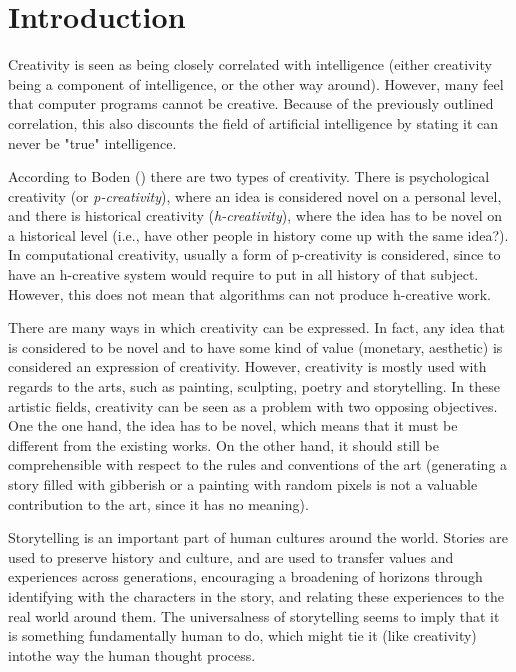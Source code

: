\section{Introduction}

Creativity is seen as being closely correlated with intelligence (either
creativity being a component of intelligence, or the other way around).
However, many feel that computer programs cannot be creative. Because of the
previously outlined correlation, this also discounts the field of artificial
intelligence by stating it can never be "true" intelligence.

According to Boden (\cite{Boden1998347})
there are two types of creativity. There is psychological creativity (or
\emph{p-creativity}), where an idea is considered novel on a personal level, and
there is historical creativity (\emph{h-creativity}), where the idea has to be
novel on a historical level (i.e., have other people in history come up with the
same idea?).
In computational creativity, usually a form of p-creativity is considered, since
to have an h-creative system would require to put in all history of that
subject. However, this does not mean that algorithms can not produce h-creative
work.

There are many ways in which creativity can be expressed. In fact, any idea that
is considered to be novel and to have some kind of value (monetary, aesthetic) is
considered an expression of creativity. However, creativity is mostly used with regards to
the arts, such as painting, sculpting, poetry and storytelling. In these
artistic fields, creativity can be seen as a problem with two opposing
objectives. One the one hand, the idea has to be novel, which means that it must be different from
the existing works. On the other hand, it should still be comprehensible with
respect to the rules and conventions of the art (generating a story filled with
gibberish or a painting with random pixels is not a valuable contribution to the
art, since it has no meaning).

Storytelling is an important part of human cultures around the world.
Stories are used to preserve history and culture, and are used to transfer values
and experiences across generations, encouraging a broadening of horizons through
identifying with the characters in the story, and relating these experiences to
the real world around them. The universalness of storytelling seems to imply
that it is something fundamentally human to do, which might tie it (like
creativity) intothe way the human thought process.

